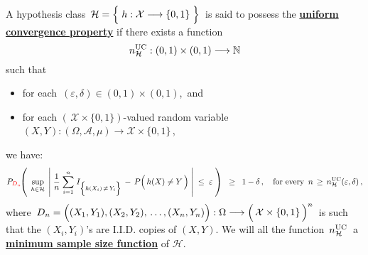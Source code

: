 \vskip 1.0cm
\begin{definition}
\mbox{}\vskip 0.1cm
\noindent
A hypothesis class
\,$\mathcal{H} = \left\{\; h : \mathcal{X} \overset{{\color{white}-}}{\longrightarrow} \{0,1\} \;\right\}$\,
is said to possess the \underline{\textbf{uniform convergence property}} if
there exists a function
\begin{equation*}
n^{\textnormal{UC}}_{\mathcal{H}} : (0,1) \times (0,1) \longrightarrow \mathbb{N}
\end{equation*}
such that
\begin{itemize}
\item
	for each \,$(\varepsilon,\delta) \in (0,1) \times (0,1)$,\, and
\item
	for each $\left(\,\mathcal{X}\times\{0,1\}\right)$-valued random variable
	$(X,Y) : (\Omega,\mathcal{A},\mu) \longrightarrow \mathcal{X}\times\{0,1\}$\,,
\end{itemize}
we have:
\begin{equation*}
P_{{\color{red}D_{n}}}\!\!\left(\;\,
	\underset{h \in \mathcal{H}}{\sup}\;\left\vert\;
		\dfrac{1}{n}\;\overset{n}{\underset{i=1}{\sum}}\;
			I_{\left\{h(X_{i})\,\overset{{\color{white}.}}{\neq}\,Y_{i}\right\}}
			\,-\,
			P\!\left(\,\overset{{\color{white}.}}{h}(X) \neq Y \,\right)
		\;\right\vert
	\;\leq\;
		\varepsilon
	\;\right)
\;\; \geq \;\;
	1 - \delta\,,
\quad
	\textnormal{for every \,$n \,\geq\, n^{\textnormal{UC}}_{\mathcal{H}}(\varepsilon,\delta)$}\,,
\end{equation*}
where
\,$D_{n} = \left((X_{1},Y_{1}),(X_{2},Y_{2}),\,\overset{{\color{white}\vert}}{\ldots}\,,(X_{n},Y_{n})\right)
	: \Omega \longrightarrow
	\left(\,\mathcal{X}\overset{{\color{white}.}}{\times}\{0,1\}\,\right)^{n}$\,
is such that the
$(X_{i},Y_{i})$'s are I.I.D. copies of $(X,Y)$.
We will all the function \,$n^{\textnormal{UC}}_{\mathcal{H}}$\,
a \underline{\textbf{minimum sample size function}} of $\mathcal{H}$.
\end{definition}


